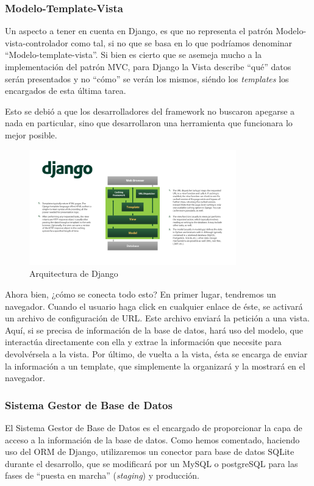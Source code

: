 \subsubsection{Modelo-Template-Vista}
Un aspecto a tener en cuenta en Django, es que no representa el patrón Modelo-vista-controlador como tal, si no que se basa en lo que podríamos denominar ``Modelo-template-vista''. Si bien es cierto que se asemeja mucho a la implementación del patrón MVC, para Django la Vista describe ``qué'' datos serán presentados y no ``cómo'' se verán los mismos, siéndo los \textit{templates} los encargados de esta última tarea.

Esto se debió a que los desarrolladores del framework no buscaron apegarse a nada en particular, sino que desarrollaron una herramienta que funcionara lo mejor posible.

\begin{figure}[H]
  \begin{center}
  \includegraphics[width=0.8\textwidth]{../images/django_arch.png}
  \caption{Arquitectura de Django}
  \label{fig:django_arch}
  \end{center}
\end{figure}

Ahora bien, ¿cómo se conecta todo esto? En primer lugar, tendremos un navegador. Cuando el usuario haga click en cualquier enlace de éste, se activará un archivo de configuración de URL. Este archivo enviará la petición a una vista. Aquí, si se precisa de información de la base de datos, hará uso del modelo, que interactúa directamente con ella y extrae la información que necesite para devolvérsela a la vista. Por último, de vuelta a la vista, ésta se encarga de enviar la información a un template, que simplemente la organizará y la mostrará en el navegador.

\subsubsection{Sistema Gestor de Base de Datos}
El Sistema Gestor de Base de Datos es el encargado de proporcionar la capa de acceso a la información de la base de datos. Como hemos comentado, haciendo uso del ORM de Django, utilizaremos un conector para base de datos SQLite durante el desarrollo, que se modificará por un MySQL o postgreSQL para las fases de ``puesta en marcha'' (\textit{staging}) y producción.

